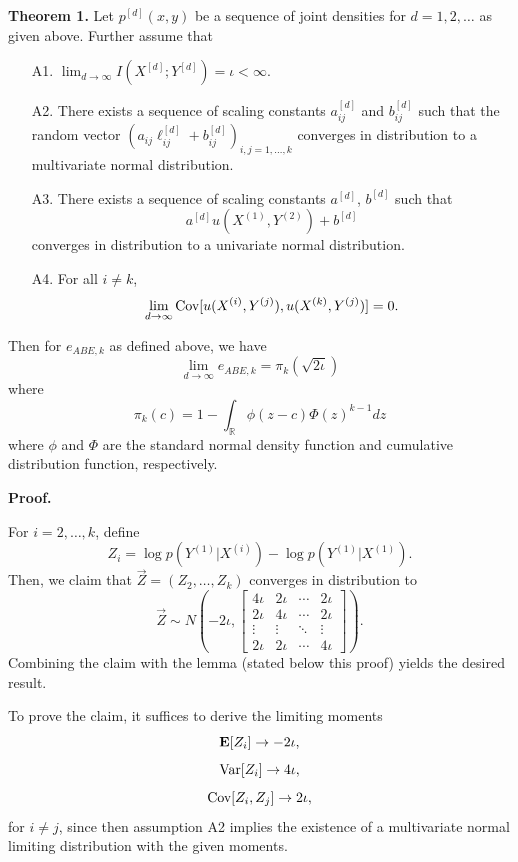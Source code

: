 \documentclass[12pt]{article}
\begin{document}
\textbf{Theorem 1.} Let $p^{[d]}(x, y)$ be a sequence of joint densities
for $d = 1,2,\hdots$ as given above.  Further assume that
\begin{itemize}
\item[A1.] $\lim_{d \to \infty} I(X^{[d]}; Y^{[d]}) = \iota < \infty.$
\item[A2.] There exists a sequence of scaling constants $a_{ij}^{[d]}$
and $b_{ij}^{[d]}$ such that the random vector $(a_{ij}\ell_{ij}^{[d]} +
b_{ij}^{[d]})_{i, j = 1,\hdots, k}$ converges in distribution to a
multivariate normal distribution.
\item[A3.] There exists a sequence of scaling constants $a^{[d]}$, $b^{[d]}$ such that
\[
a^{[d]}u(X^{(1)}, Y^{(2)}) + b^{[d]}
\]
converges in distribution to a univariate normal distribution.
\item[A4.] For all $i \neq k$,
\[\lim_{d \to \infty}\text{Cov}[u(X^{(i)}, Y^{(j)}), u(X^{(k)}, Y^{(j)})] = 0.\]
\end{itemize}
Then for $e_{ABE, k}$ as defined above, we have
\[
\lim_{d \to \infty} e_{ABE, k} = \pi_k(\sqrt{2 \iota})
\]
where
\[
\pi_k(c) = 1 - \int_{\mathbb{R}} \phi(z - c)  \Phi(z)^{k-1} dz
\]
where $\phi$ and $\Phi$ are the standard normal density function and
cumulative distribution function, respectively.


\textbf{Proof.}

For $i = 2,\hdots, k$, define
\[
Z_i = \log p(Y^{(1)}|X^{(i)}) - \log p(Y^{(1)}|X^{(1)}).
\]
Then, we claim that $\vec{Z} = (Z_2,\hdots, Z_k)$ converges in distribution to
\[
\vec{Z} \sim N\left(-2\iota, 
\begin{bmatrix}
4\iota & 2\iota & \cdots & 2\iota\\
2\iota & 4\iota & \cdots & 2\iota\\
\vdots & \vdots & \ddots & \vdots\\
2\iota & 2\iota & \cdots & 4\iota
\end{bmatrix}
\right).
\]
Combining the claim with the lemma (stated below this proof) yields the
desired result.

To prove the claim, it suffices to derive the limiting moments
\[\textbf{E}[Z_i] \to -2\iota,\]
\[\text{Var}[Z_i] \to 4\iota,\]
\[\text{Cov}[Z_i, Z_j] \to 2\iota,\]
for $i \neq j$,
since then assumption A2 implies the existence of a multivariate normal
limiting distribution with the given moments.
\end{document}
